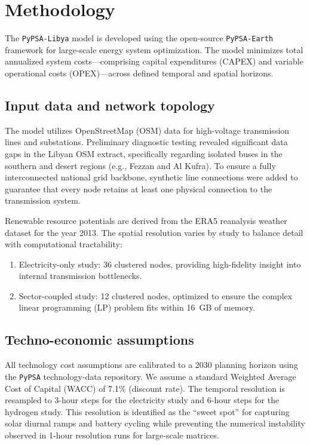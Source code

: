\documentclass[preprint,12pt]{elsarticle}
\begin{document}
\section{Methodology}
\label{sec:methodology}

The \texttt{PyPSA-Libya} model is developed using the open-source \texttt{PyPSA-Earth} framework for large-scale energy system optimization. The model minimizes total annualized system costs—comprising capital expenditures (CAPEX) and variable operational costs (OPEX)—across defined temporal and spatial horizons.

\subsection{Input data and network topology}
The model utilizes OpenStreetMap (OSM) data for high-voltage transmission lines and substations. Preliminary diagnostic testing revealed significant data gaps in the Libyan OSM extract, specifically regarding isolated buses in the southern and desert regions (e.g., Fezzan and Al Kufra). To ensure a fully interconnected national grid backbone, synthetic line connections were added to guarantee that every node retains at least one physical connection to the transmission system.

Renewable resource potentials are derived from the ERA5 reanalysis weather dataset for the year 2013. The spatial resolution varies by study to balance detail with computational tractability:
\begin{enumerate}
    \item {Electricity-only study:} 36 clustered nodes, providing high-fidelity insight into internal transmission bottlenecks.
    \item {Sector-coupled study:} 12 clustered nodes, optimized to ensure the complex linear programming (LP) problem fits within 16~GB of memory.
\end{enumerate}

\subsection{Techno-economic assumptions}
All technology cost assumptions are calibrated to a 2030 planning horizon using the \texttt{PyPSA} technology-data repository. We assume a standard Weighted Average Cost of Capital (WACC) of 7.1\% (discount rate). The temporal resolution is resampled to 3-hour steps for the electricity study and 6-hour steps for the hydrogen study. This resolution is identified as the ``sweet spot'' for capturing solar diurnal ramps and battery cycling while preventing the numerical instability observed in 1-hour resolution runs for large-scale matrices.
\end{document}

